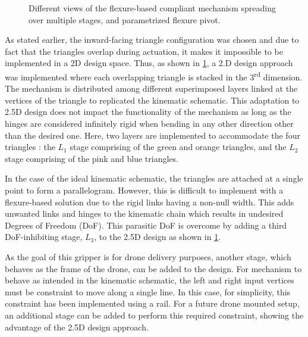 \begin{figure}[t] %
  \centering
  \resizebox{\textwidth}{!}{}
  \caption{Different views of the flexure-based compliant mechanism spreading over multiple stages, and parametrized flexure pivot.}
  \label{fig:mech_stages}
\end{figure}

As stated earlier, the inward-facing triangle configuration was chosen and due to fact that the triangles overlap during actuation, it makes it impossible to be implemented in a 2D design space. Thus, as shown in \cref{fig:mech_stages}, a 2.D design approach was implemented where each overlapping triangle is stacked in the 3\textsuperscript{rd} dimension. The mechanism is distributed among different superimposed layers linked at the vertices of the triangle to replicated the kinematic schematic. This adaptation to 2.5D design does not impact the functionality of the mechanism as long as the hinges are considered infinitely rigid when bending in any other direction other than the desired one. Here, two layers are implemented to accommodate the four triangles : the $L_1$ stage comprising of the green and orange triangles, and the $L_2$ stage comprising of the pink and blue triangles.

In the case of the ideal kinematic schematic, the triangles are attached at a single point to form a parallelogram. However, this is difficult to implement with a flexure-based solution due to the rigid links having a non-null width. This adds unwanted links and hinges to the kinematic chain which results in undesired Degrees of Freedom (DoF). This parasitic DoF is overcome by adding a third DoF-inhibiting stage, $L_3$, to the 2.5D design as shown in \cref{fig:mech_stages}.

As the goal of this gripper is for drone delivery purposes, another stage, which behaves as the frame of the drone, can be added to the design. For mechanism to behave as intended in the kinematic schematic, the left and right input vertices must be constraint to move along a single line. In this case, for simplicity, this constraint has been implemented using a rail. For a future drone mounted setup, an additional stage can be added to perform this required constraint, showing the advantage of the 2.5D design approach.

